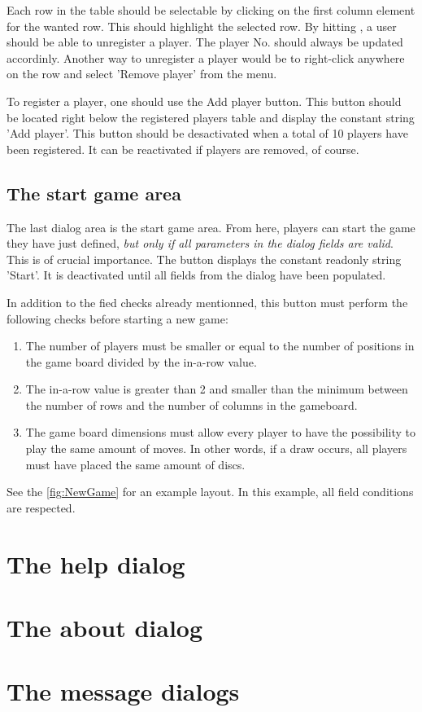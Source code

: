   Each row in the table should be selectable by clicking on the first column
  element for the wanted row. This should highlight the selected row. By hitting
  \Del, a user should be able to unregister a player. The player No. should
  always be updated accordinly. Another way to unregister a player would be to
  right-click anywhere on the row and select 'Remove player' from the menu.

  To register a player, one should use the Add player button. This button should
  be located right below the registered players table and display the constant
  string 'Add player'. This button should be desactivated when a total of 10
  players have been registered. It can be reactivated if players are removed,
  of course.


  \subsection{The start game area}
  The last dialog area is the start game area. From here, players can start the
  game they have just defined, \textit{but only if all parameters in the dialog
  fields are valid}. This is of crucial importance. The button displays the
  constant readonly string 'Start'. It is deactivated until all fields from the
  dialog have been populated.

  In addition to the fied checks already mentionned, this button must perform the
  following checks before starting a new game:

  \begin{enumerate}
    \item The number of players must be smaller or equal to the number of positions
          in the game board divided by the in-a-row value.
    \item The in-a-row value is greater than 2 and smaller than the minimum between
          the number of rows and the number of columns in the gameboard.
    \item The game board dimensions must allow every player to have the possibility
          to play the same amount of moves. In other words, if a draw occurs, all
          players must have placed the same amount of discs.
  \end{enumerate}

  \noindent See the \cref{fig:NewGame} for an example layout. In this example, all
  field conditions are respected.


\section{The help dialog} \label{dlg:Help}
\section{The about  dialog} \label{dlg:AboutCX}
\section{The message dialogs} \label{dlg::message}

